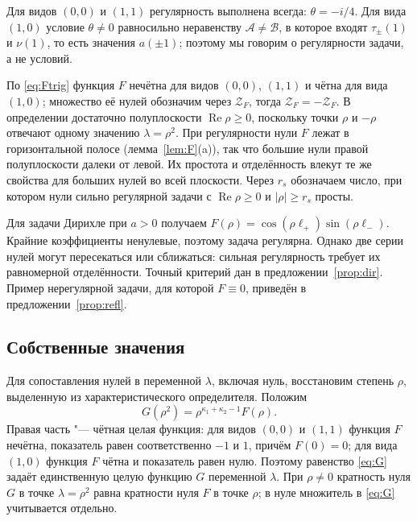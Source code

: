 \documentclass[12pt,a4paper]{article}
\numberwithin{equation}{section}
\theoremstyle{definition}
\newcommand{\abs}[1]{\lvert#1\rvert}
\newcommand{\Ree}{\operatorname{Re}}
\newcommand{\Zf}{\mathcal Z_F}
\begin{document}
Для видов $(0,0)$ и $(1,1)$ регулярность выполнена всегда: $\theta=-i/4$. Для вида $(1,0)$ условие
$\theta\ne0$ равносильно неравенству $\mathcal A\ne\mathcal B$, в которое входят $\tau_\pm(1)$ и
$\nu(1)$, то есть значения $a(\pm1)$; поэтому мы говорим о регулярности задачи, а не условий.

По \eqref{eq:Ftrig} функция $F$ нечётна для видов $(0,0)$, $(1,1)$ и чётна для
вида $(1,0)$; множество её нулей обозначим через $\Zf$, тогда $\Zf=-\Zf$.
В определении достаточно полуплоскости $\Ree\rho\ge0$, поскольку точки $\rho$ и
$-\rho$ отвечают одному значению $\lambda=\rho^2$. При регулярности нули $F$ лежат
в горизонтальной полосе (лемма~\ref{lem:F}(a)), так что большие нули правой
полуплоскости далеки от левой. Их простота и отделённость влекут те же свойства
для больших нулей во всей плоскости. Через $r_s$ обозначаем число, при котором
нули сильно регулярной задачи с $\Ree\rho\ge0$ и $\abs\rho\ge r_s$ просты.

Для задачи Дирихле при $a>0$ получаем $F(\rho)=\cos(\rho\ell_+)\sin(\rho\ell_-)$.
Крайние коэффициенты ненулевые, поэтому задача регулярна. Однако две серии
нулей могут пересекаться или сближаться: сильная регулярность требует их
равномерной отделённости. Точный критерий дан в предложении~\ref{prop:dir}.
Пример нерегулярной задачи, для которой $F\equiv0$, приведён в
предложении~\ref{prop:refl}.

\subsection{Собственные значения}\label{ss:eig}

Для сопоставления нулей в переменной $\lambda$, включая нуль, восстановим степень
$\rho$, выделенную из характеристического определителя. Положим
\begin{equation}\label{eq:G}
 G(\rho^2)=\rho^{\kappa_1+\kappa_2-1}F(\rho).
\end{equation}
Правая часть "--- чётная целая функция: для видов $(0,0)$ и $(1,1)$ функция $F$
нечётна, показатель равен соответственно $-1$ и $1$, причём $F(0)=0$;
для вида $(1,0)$ функция $F$ чётна и показатель равен нулю. Поэтому равенство
\eqref{eq:G} задаёт единственную целую функцию $G$ переменной $\lambda$.
При $\rho\ne0$ кратность нуля $G$ в точке $\lambda=\rho^2$ равна кратности нуля
$F$ в точке $\rho$; в нуле множитель в \eqref{eq:G} учитывается отдельно.
\end{document}
